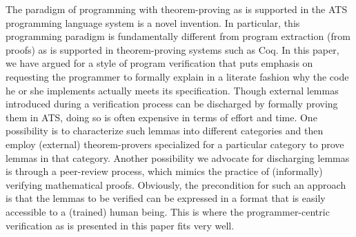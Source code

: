 \documentclass{llncs}
\begin{document}
The paradigm of programming with theorem-proving as is supported in the ATS
programming language system is a novel invention. In particular, this
programming paradigm is fundamentally different from program extraction
(from proofs) as is supported in theorem-proving systems such as Coq.  In
this paper, we have argued for a style of program verification that puts
emphasis on requesting the programmer to formally explain in a literate
fashion why the code he or she implements actually meets its specification.
Though external lemmas introduced during a verification process can be
discharged by formally proving them in ATS, doing so is often expensive in
terms of effort and time.  One possibility is to characterize such lemmas
into different categories and then employ (external) theorem-provers
specialized for a particular category to prove lemmas in that category.
Another possibility we advocate for discharging lemmas is through a
peer-review process, which mimics the practice of (informally) verifying
mathematical proofs. Obviously, the precondition for such an approach is
that the lemmas to be verified can be expressed in a format that is easily
accessible to a (trained) human being. This is where the programmer-centric
verification as is presented in this paper fits very well.

%


\end{document}
